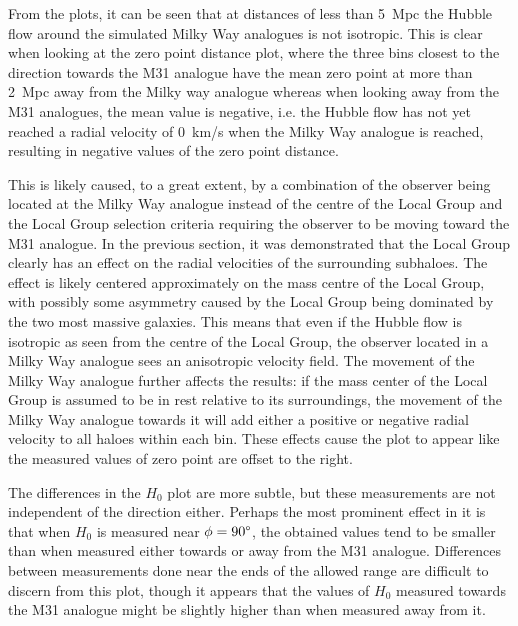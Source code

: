 \documentclass[english, oneside]{HYgradu}
\begin{document}
From the plots, it can be seen that at distances of less than 5~Mpc the Hubble flow around the simulated Milky Way analogues is not isotropic. This is clear when looking at the zero point distance plot, where the three bins closest to the direction towards the M31 analogue have the mean zero point at more than 2~Mpc away from the Milky way analogue whereas when looking away from the M31 analogues, the mean value is negative, i.e. the Hubble flow has not yet reached a radial velocity of 0~km/s when the Milky Way analogue is reached, resulting in negative values of the zero point distance.

This is likely caused, to a great extent, by a combination of the observer being located at the Milky Way analogue instead of the centre of the Local Group and the Local Group selection criteria requiring the observer to be moving toward the M31 analogue. In the previous section, it was demonstrated that the Local Group clearly has an effect on the radial velocities of the surrounding subhaloes. The effect is likely centered approximately on the mass centre of the Local Group, with possibly some asymmetry caused by the Local Group being dominated by the two most massive galaxies. This means that even if the Hubble flow is isotropic as seen from the centre of the Local Group, the observer located in a Milky Way analogue sees an anisotropic velocity field.
The movement of the Milky Way analogue further affects the results: if the mass center of the Local Group is assumed to be in rest relative to its surroundings, the movement of the Milky Way analogue towards it will add either a positive or negative radial velocity to all haloes within each bin. These effects cause the plot to appear like the measured values of zero point are offset to the right.

The differences in the $H_0$ plot are more subtle, but these measurements are not independent of the direction either. Perhaps the most prominent effect in it is that when $H_0$ is measured near $\phi = 90\degree$, the obtained values tend to be smaller than when measured either towards or away from the M31 analogue. Differences between measurements done near the ends of the allowed range are difficult to discern from this plot, though it appears that the values of $H_0$ measured towards the M31 analogue might be slightly higher than when measured away from it.
\end{document}
